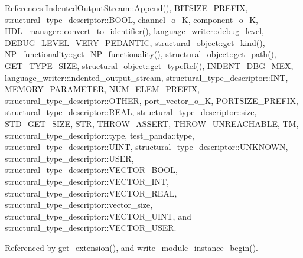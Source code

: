 References Indented\+Output\+Stream\+::\+Append(), B\+I\+T\+S\+I\+Z\+E\+\_\+\+P\+R\+E\+F\+IX, structural\+\_\+type\+\_\+descriptor\+::\+B\+O\+OL, channel\+\_\+o\+\_\+K, component\+\_\+o\+\_\+K, H\+D\+L\+\_\+manager\+::convert\+\_\+to\+\_\+identifier(), language\+\_\+writer\+::debug\+\_\+level, D\+E\+B\+U\+G\+\_\+\+L\+E\+V\+E\+L\+\_\+\+V\+E\+R\+Y\+\_\+\+P\+E\+D\+A\+N\+T\+IC, structural\+\_\+object\+::get\+\_\+kind(), N\+P\+\_\+functionality\+::get\+\_\+\+N\+P\+\_\+functionality(), structural\+\_\+object\+::get\+\_\+path(), G\+E\+T\+\_\+\+T\+Y\+P\+E\+\_\+\+S\+I\+ZE, structural\+\_\+object\+::get\+\_\+type\+Ref(), I\+N\+D\+E\+N\+T\+\_\+\+D\+B\+G\+\_\+\+M\+EX, language\+\_\+writer\+::indented\+\_\+output\+\_\+stream, structural\+\_\+type\+\_\+descriptor\+::\+I\+NT, M\+E\+M\+O\+R\+Y\+\_\+\+P\+A\+R\+A\+M\+E\+T\+ER, N\+U\+M\+\_\+\+E\+L\+E\+M\+\_\+\+P\+R\+E\+F\+IX, structural\+\_\+type\+\_\+descriptor\+::\+O\+T\+H\+ER, port\+\_\+vector\+\_\+o\+\_\+K, P\+O\+R\+T\+S\+I\+Z\+E\+\_\+\+P\+R\+E\+F\+IX, structural\+\_\+type\+\_\+descriptor\+::\+R\+E\+AL, structural\+\_\+type\+\_\+descriptor\+::size, S\+T\+D\+\_\+\+G\+E\+T\+\_\+\+S\+I\+ZE, S\+TR, T\+H\+R\+O\+W\+\_\+\+A\+S\+S\+E\+RT, T\+H\+R\+O\+W\+\_\+\+U\+N\+R\+E\+A\+C\+H\+A\+B\+LE, TM, structural\+\_\+type\+\_\+descriptor\+::type, test\+\_\+panda\+::type, structural\+\_\+type\+\_\+descriptor\+::\+U\+I\+NT, structural\+\_\+type\+\_\+descriptor\+::\+U\+N\+K\+N\+O\+WN, structural\+\_\+type\+\_\+descriptor\+::\+U\+S\+ER, structural\+\_\+type\+\_\+descriptor\+::\+V\+E\+C\+T\+O\+R\+\_\+\+B\+O\+OL, structural\+\_\+type\+\_\+descriptor\+::\+V\+E\+C\+T\+O\+R\+\_\+\+I\+NT, structural\+\_\+type\+\_\+descriptor\+::\+V\+E\+C\+T\+O\+R\+\_\+\+R\+E\+AL, structural\+\_\+type\+\_\+descriptor\+::vector\+\_\+size, structural\+\_\+type\+\_\+descriptor\+::\+V\+E\+C\+T\+O\+R\+\_\+\+U\+I\+NT, and structural\+\_\+type\+\_\+descriptor\+::\+V\+E\+C\+T\+O\+R\+\_\+\+U\+S\+ER.



Referenced by get\+\_\+extension(), and write\+\_\+module\+\_\+instance\+\_\+begin().

